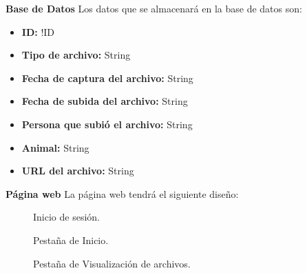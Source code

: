  \noindent \textbf{\large Base de Datos} \newline
Los datos que se almacenará en la base de datos son:
\begin{itemize}
    \item \textbf{ID:} !ID
    \item \textbf{Tipo de archivo:} String
    \item \textbf{Fecha de captura del archivo:} String
    \item \textbf{Fecha de subida del archivo:} String
    \item \textbf{Persona que subió el archivo:} String
    \item \textbf{Animal:} String
    \item \textbf{URL del archivo:} String
\end{itemize}

 \noindent \textbf{\large Página web} \newline
La página web tendrá el siguiente diseño:
\begin{figure}[H]
    \centering
    \caption{Inicio de sesión.}
\end{figure}
\begin{figure}[H]
    \centering
    \caption{Pestaña de Inicio.}
\end{figure}
\begin{figure}[H]
    \centering
    \caption{Pestaña de Visualización de archivos.}
\end{figure}

\endinput 